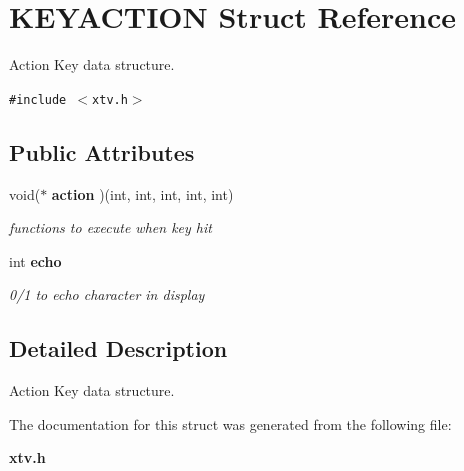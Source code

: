 \section{KEYACTION Struct Reference}
\label{structKEYACTION}
Action Key data structure.  


{\tt \#include $<$xtv.h$>$}

\subsection*{Public Attributes}
\begin{CompactItemize}
\item 
void($\ast$ {\bf action} )(int, int, int, int, int)\label{structKEYACTION_o0}

\begin{CompactList}\small\item\em functions to execute when key hit \item\end{CompactList}\item 
int {\bf echo}\label{structKEYACTION_o1}

\begin{CompactList}\small\item\em 0/1 to echo character in display \item\end{CompactList}\end{CompactItemize}


\subsection{Detailed Description}
Action Key data structure. 



The documentation for this struct was generated from the following file:\begin{CompactItemize}
\item 
{\bf xtv.h}\end{CompactItemize}
